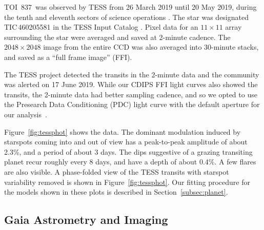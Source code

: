 \documentclass[12pt,twocolumn,tighten]{aastex63}
\newcommand{\tn}{TOI~837} %
\begin{document}
\tn\ was observed by TESS from 26 March 2019 until 20 May 2019, during
the tenth and eleventh sectors of science operations
\citep{ricker_transiting_2015}.  The star was designated
TIC\,460205581 in the TESS Input Catalog
\citep{stassun_TIC_2018,stassun_TIC8_2019}.  Pixel data for an
$11\times11$ array surrounding the star were averaged and saved at
2-minute cadence.  The $2048\times2048$ image from the entire CCD was
also averaged into 30-minute stacks, and saved as a ``full frame
image'' (FFI).

The TESS project detected the transits in the 2-minute data and the
community was alerted on 17 June 2019.  While our CDIPS FFI light
curves also showed the transits, the 2-minute data had better sampling
cadence, and so we opted to use the Presearch Data Conditioning (PDC)
light curve with the default aperture for our
analysis~\citep{smith_kepler_2012,stumpe_multiscale_2014,jenkins_tess_2016,smith_finding_2016}.

Figure~\ref{fig:tessphot} shows the data.  The dominant modulation
induced by starspots coming into and out of view has a peak-to-peak
amplitude of about 2.3\%, and a period of about 3 days.  The dips
suggestive of a grazing transiting planet recur roughly every 8 days,
and have a depth of about 0.4\%.  A few flares are also visible.  A
phase-folded view of the TESS transits with starspot variability
removed is shown in Figure~\ref{fig:tessphot}. Our fitting procedure
for the models shown in these plots is described in
Section~\ref{subsec:planet}.


\subsection{Gaia Astrometry and Imaging}
\label{subsec:gaia}
\end{document}
